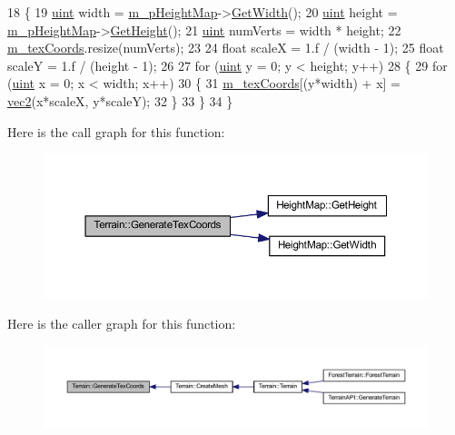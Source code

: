 \begin{DoxyCode}
18 \{
19   \hyperlink{_types_8h_a4f5fce8c1ef282264f9214809524d836}{uint} width = \hyperlink{class_terrain_a1573c3a4a21afe306700bd00e7a9b4f5}{m\_pHeightMap}->\hyperlink{class_height_map_a85709e10bb08442730bfddb649a86e0b}{GetWidth}();
20   \hyperlink{_types_8h_a4f5fce8c1ef282264f9214809524d836}{uint} height = \hyperlink{class_terrain_a1573c3a4a21afe306700bd00e7a9b4f5}{m\_pHeightMap}->\hyperlink{class_height_map_a4c1243d24a8c5d039ea967a57a7bf462}{GetHeight}();
21   \hyperlink{_types_8h_a4f5fce8c1ef282264f9214809524d836}{uint} numVerts = width * height;
22   \hyperlink{class_terrain_a5b85196bac6771bddd1b99ac51952626}{m\_texCoords}.resize(numVerts);
23 
24   \textcolor{keywordtype}{float} scaleX = 1.f / (width - 1);
25   \textcolor{keywordtype}{float} scaleY = 1.f / (height - 1);
26 
27   \textcolor{keywordflow}{for} (\hyperlink{_types_8h_a4f5fce8c1ef282264f9214809524d836}{uint} y = 0; y < height; y++)
28   \{
29     \textcolor{keywordflow}{for} (\hyperlink{_types_8h_a4f5fce8c1ef282264f9214809524d836}{uint} x = 0; x < width; x++)
30     \{
31       \hyperlink{class_terrain_a5b85196bac6771bddd1b99ac51952626}{m\_texCoords}[(y*width) + x] = \hyperlink{_types_8h_a43182e59794291f6ab00e51b160706c2}{vec2}(x*scaleX, y*scaleY);
32     \}
33   \}
34 \}
\end{DoxyCode}


Here is the call graph for this function\+:
\nopagebreak
\begin{figure}[H]
\begin{center}
\leavevmode
\includegraphics[width=350pt]{class_terrain_a39c46be48d267589430a97b00cd3399d_cgraph}
\end{center}
\end{figure}




Here is the caller graph for this function\+:
\nopagebreak
\begin{figure}[H]
\begin{center}
\leavevmode
\includegraphics[width=350pt]{class_terrain_a39c46be48d267589430a97b00cd3399d_icgraph}
\end{center}
\end{figure}


